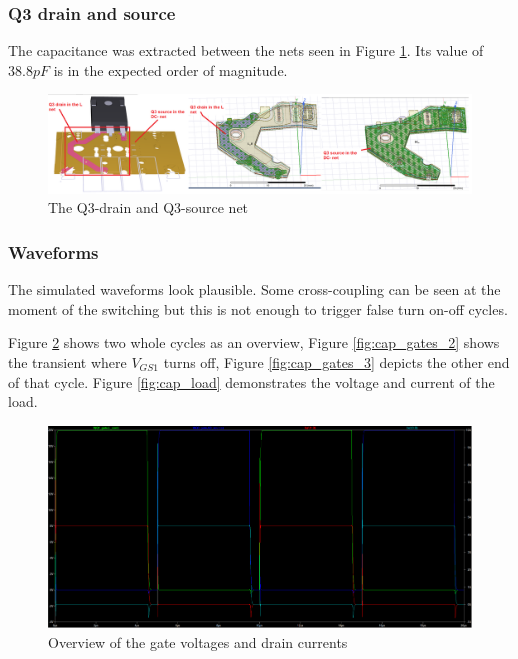 \subsubsection{Q3 drain and source}
\label{sec:q3_drain_source}

The capacitance was extracted between the nets seen in Figure \ref{fig:cap_q3_d_s}. Its value of $38.8 pF$ is in the expected order of magnitude.

\begin{figure}[H]
	\centering
	\includegraphics[width=\textwidth]{pictures/implementation/cap/cap_q3_d_s.PNG}
	\caption{The Q3-drain and Q3-source net}
	\label{fig:cap_q3_d_s}
\end{figure}


\subsubsection{Waveforms}
\label{sec:cap_waveforms}

The simulated waveforms look plausible. Some cross-coupling can be seen at the moment of the switching but this is not enough to trigger false turn on-off cycles.

Figure \ref{fig:cap_gates_1} shows two whole cycles as an overview, Figure \ref{fig:cap_gates_2} shows the transient where $V_{GS1}$ turns off, Figure \ref{fig:cap_gates_3} depicts the other end of that cycle. Figure \ref{fig:cap_load} demonstrates the voltage and current of the load.

\begin{figure}[H]
	\centering
	\includegraphics[width=\textwidth]{pictures/implementation/cap/cap_gates_1.PNG}
	\caption{Overview of the gate voltages and drain currents}
	\label{fig:cap_gates_1}
\end{figure}

